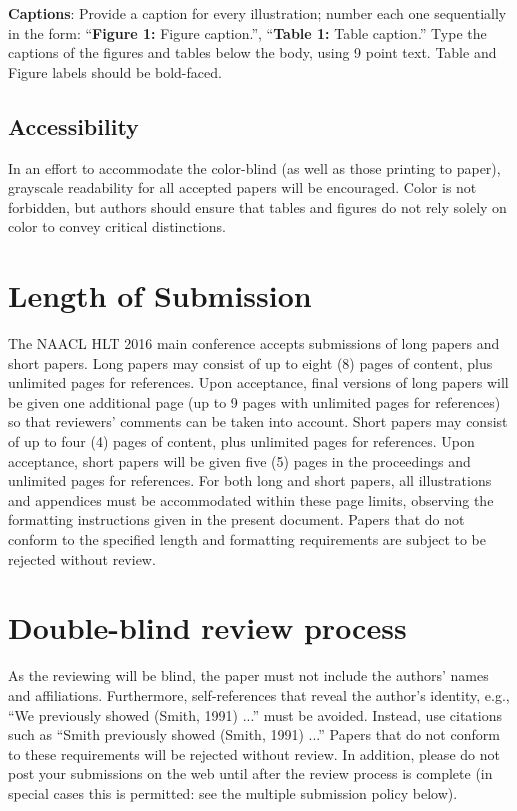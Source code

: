 \documentclass[11pt,letterpaper]{article}
\begin{document}
{\bf Captions}: Provide a caption for every illustration; number each one
sequentially in the form:  ``{\bf Figure 1:} Figure caption.'', ``{\bf Table 1:} Table caption.''  Type the captions of the figures and 
tables below the body, using 9 point text.  Table and Figure labels should be bold-faced.

\subsection{Accessibility}
\label{ssec:accessibility}

In an effort to accommodate the color-blind (as well as those printing
to paper), grayscale readability for all accepted papers will be
encouraged.  Color is not forbidden, but authors should ensure that
tables and figures do not rely solely on color to convey critical
distinctions.

\section{Length of Submission}
\label{sec:length}

The NAACL HLT 2016 main conference accepts submissions of long papers and short papers.  Long papers may consist of up to eight (8) pages of content, plus unlimited pages for references. Upon acceptance, final versions of long papers will be given one additional page (up to 9 pages with unlimited pages for references) so that reviewers' comments can be taken into account.  Short papers may consist of up to four (4) pages of content, plus unlimited pages for references. Upon acceptance, short papers will be given five (5) pages in the proceedings and unlimited pages for references.  For both long and short papers, all illustrations and appendices must be accommodated within these page limits, observing the formatting instructions given in the present document.  Papers that do not conform to the specified length and formatting requirements are subject to be rejected without review.


\section{Double-blind review process}
\label{sec:blind}

As the reviewing will be blind, the paper must not include the
authors' names and affiliations.  Furthermore, self-references that
reveal the author's identity, e.g., ``We previously showed (Smith,
1991) ...'' must be avoided. Instead, use citations such as ``Smith
previously showed (Smith, 1991) ...'' Papers that do not conform to
these requirements will be rejected without review. In addition,
please do not post your submissions on the web until after the
review process is complete (in special cases this is permitted: see 
the multiple submission policy below).
\end{document}

